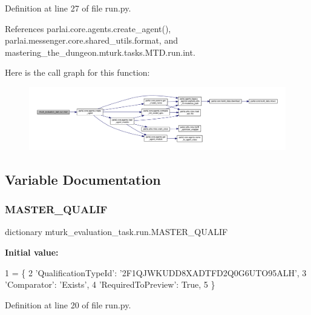 Definition at line 27 of file run.\+py.



References parlai.\+core.\+agents.\+create\+\_\+agent(), parlai.\+messenger.\+core.\+shared\+\_\+utils.\+format, and mastering\+\_\+the\+\_\+dungeon.\+mturk.\+tasks.\+M\+T\+D.\+run.\+int.

Here is the call graph for this function\+:
\nopagebreak
\begin{figure}[H]
\begin{center}
\leavevmode
\includegraphics[width=350pt]{namespacemturk__evaluation__task_1_1run_abf2de8d01fae9d5ced027d42bd2104ec_cgraph}
\end{center}
\end{figure}


\subsection{Variable Documentation}
\mbox{\label{namespacemturk__evaluation__task_1_1run_adf576b3c37139529f3d213bedd51a6d3}} 
\subsubsection{\texorpdfstring{M\+A\+S\+T\+E\+R\+\_\+\+Q\+U\+A\+L\+IF}{MASTER\_QUALIF}}
{\footnotesize\ttfamily dictionary mturk\+\_\+evaluation\+\_\+task.\+run.\+M\+A\+S\+T\+E\+R\+\_\+\+Q\+U\+A\+L\+IF}

{\bfseries Initial value\+:}
\begin{DoxyCode}
1 =  \{
2     \textcolor{stringliteral}{'QualificationTypeId'}: \textcolor{stringliteral}{'2F1QJWKUDD8XADTFD2Q0G6UTO95ALH'},
3     \textcolor{stringliteral}{'Comparator'}: \textcolor{stringliteral}{'Exists'},
4     \textcolor{stringliteral}{'RequiredToPreview'}: \textcolor{keyword}{True},
5 \}
\end{DoxyCode}


Definition at line 20 of file run.\+py.

